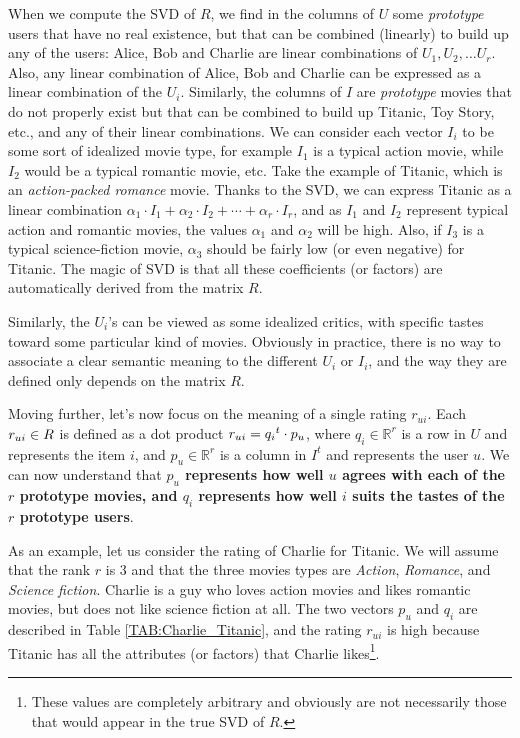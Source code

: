 When we compute the SVD of $R$, we find in the columns of $U$ some
\textit{prototype} users that have no real existence, but that can be combined
(linearly) to build up any of the users: Alice, Bob and Charlie are linear
combinations of $U_1, U_2, \dots U_r$. Also, any linear combination of Alice,
Bob and Charlie can be expressed as a linear combination of the $U_i$. Similarly, the columns of $I$ are
\textit{prototype} movies that do not properly exist but that can be combined
to build up Titanic, Toy Story, etc., and any of their linear combinations. We can consider each vector $I_i$
to be some sort of idealized movie type, for example $I_1$ is a typical action
movie, while $I_2$ would be a typical romantic movie, etc. Take the example of
Titanic, which is an \textit{action-packed romance} movie. Thanks to the SVD,
we can express Titanic  as a linear combination $\alpha_1 \cdot I_1 + \alpha_2
\cdot I_2 + \cdots + \alpha_r \cdot I_r$, and as $I_1$ and $I_2$ represent
typical action and romantic movies, the values $\alpha_1$ and $\alpha_2$
will be high. Also, if
$I_3$ is a typical science-fiction movie, $\alpha_3$ should be fairly low (or
even negative) for Titanic. The magic of SVD is that all these coefficients (or factors)
are automatically derived from the matrix $R$.

Similarly, the $U_i$'s can be viewed as some idealized critics, with specific
tastes toward some particular kind of movies. Obviously in practice, there is
no way to associate a clear semantic meaning to the different $U_i$ or $I_i$,
and the way they are defined only depends on the matrix $R$.

Moving further, let's now focus on the meaning of a single rating $r_{ui}$.
Each $r_{ui} \in R$ is defined as a dot product $r_{ui} =
{q_i}^t \cdot p_u$, where $q_i \in \mathbb{R}^r$ is a row in $U$ and represents
the item $i$, and $p_u \in \mathbb{R}^r$ is a column in $I^t$ and represents the
user $u$. We can now understand that \textbf{$p_u$ represents how well $u$
agrees with each of the $r$ prototype movies, and $q_i$ represents how well $i$
suits the tastes of the $r$ prototype users}.

As an example, let us consider the rating of Charlie for Titanic. We will
assume that the rank $r$ is $3$ and that the three movies types are
\textit{Action}, \textit{Romance}, and \textit{Science fiction}. Charlie is a
guy who loves action movies and likes romantic movies, but does not like
science fiction at all. The two vectors $p_u$ and $q_i$ are described in Table
\ref{TAB:Charlie_Titanic}, and the rating $r_{ui}$ is high because Titanic
has all the attributes (or factors) that Charlie likes\footnote{These values
are completely arbitrary and obviously are not necessarily those that would
appear in the true SVD of $R$.}.

